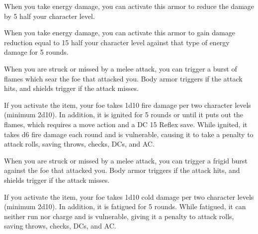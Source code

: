 
 When you take energy damage, you can activate this armor to reduce the damage by 5 \add half your character level.


 When you take energy damage, you can activate this armor to gain damage reduction equal to 15 \add half your character level against that type of energy damage for 5 rounds.


 When you are struck or missed by a melee attack, you can trigger a burst of flames which sear the foe that attacked you. Body armor triggers if the attack hits, and shields trigger if the attack misses.

If you activate the item, your foe takes 1d10 fire damage per two character levels (minimum 2d10). In addition, it is ignited for 5 rounds or until it puts out the flames, which requires a move action and a DC 15 Reflex save. While ignited, it takes d6 fire damage each round and is vulnerable, causing it to take a  penalty to attack rolls, saving throws, checks, DCs, and AC.


 When you are struck or missed by a melee attack, you can trigger a frigid burst against the foe that attacked you. Body armor triggers if the attack hits, and shields trigger if the attack misses.

If you activate the item, your foe takes 1d10 cold damage per two character levels (minimum 2d10). In addition, it is fatigued for 5 rounds. While fatigued, it can neither run nor charge and is vulnerable, giving it a  penalty to attack rolls, saving throws, checks, DCs, and AC.


